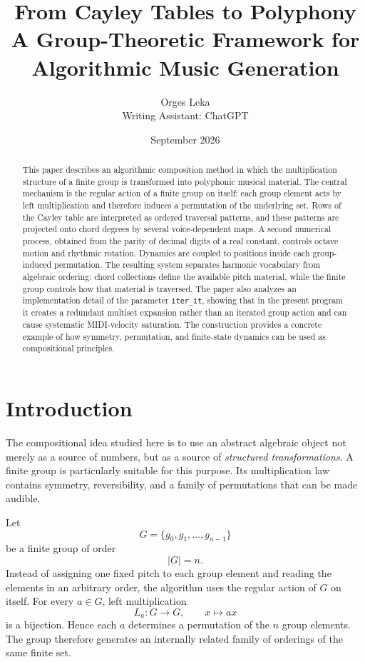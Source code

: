 \documentclass[11pt,a4paper]{article}
\title{\textbf{From Cayley Tables to Polyphony}\\[0.4em]
\large A Group-Theoretic Framework for Algorithmic Music Generation}
\author{Orges Leka\\[0.3em]\small Writing Assistant: ChatGPT}
\date{September 2026}
\begin{document}
\maketitle

\begin{abstract}
This paper describes an algorithmic composition method in which the multiplication structure of a finite group is transformed into polyphonic musical material. The central mechanism is the regular action of a finite group on itself: each group element acts by left multiplication and therefore induces a permutation of the underlying set. Rows of the Cayley table are interpreted as ordered traversal patterns, and these patterns are projected onto chord degrees by several voice-dependent maps. A second numerical process, obtained from the parity of decimal digits of a real constant, controls octave motion and rhythmic rotation. Dynamics are coupled to positions inside each group-induced permutation. The resulting system separates harmonic vocabulary from algebraic ordering: chord collections define the available pitch material, while the finite group controls how that material is traversed. The paper also analyzes an implementation detail of the parameter \texttt{iter\_it}, showing that in the present program it creates a redundant multiset expansion rather than an iterated group action and can cause systematic MIDI-velocity saturation. The construction provides a concrete example of how symmetry, permutation, and finite-state dynamics can be used as compositional principles.
\end{abstract}

\section{Introduction}

The compositional idea studied here is to use an abstract algebraic object not merely as a source of numbers, but as a source of \emph{structured transformations}. A finite group is particularly suitable for this purpose. Its multiplication law contains symmetry, reversibility, and a family of permutations that can be made audible.

Let
\[
G=\{g_0,g_1,\ldots,g_{n-1}\}
\]
be a finite group of order
\[
|G|=n.
\]
Instead of assigning one fixed pitch to each group element and reading the elements in an arbitrary order, the algorithm uses the regular action of $G$ on itself. For every $a\in G$, left multiplication
\[
L_a:G\longrightarrow G,\qquad x\longmapsto ax
\]
is a bijection. Hence each $a$ determines a permutation of the $n$ group elements. The group therefore generates an internally related family of orderings of the same finite set.
\end{document}
